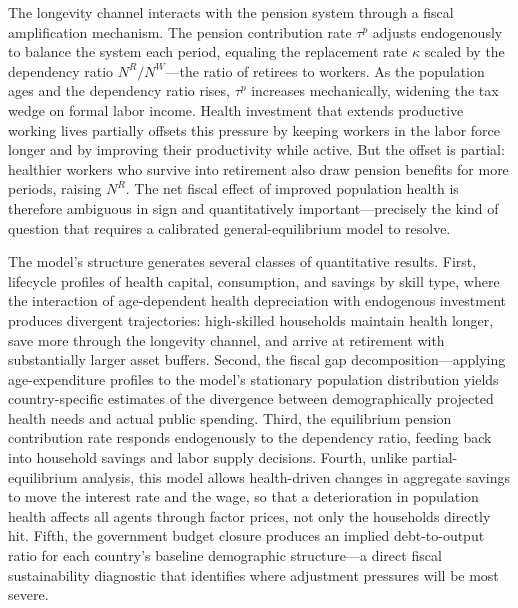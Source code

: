 \documentclass[12pt,a4paper]{article}
\begin{document}
The longevity channel interacts with the pension system through a fiscal amplification mechanism. The pension contribution rate $\tau^p$ adjusts endogenously to balance the system each period, equaling the replacement rate $\kappa$ scaled by the dependency ratio $N^R/N^W$---the ratio of retirees to workers. As the population ages and the dependency ratio rises, $\tau^p$ increases mechanically, widening the tax wedge on formal labor income. Health investment that extends productive working lives partially offsets this pressure by keeping workers in the labor force longer and by improving their productivity while active. But the offset is partial: healthier workers who survive into retirement also draw pension benefits for more periods, raising $N^R$. The net fiscal effect of improved population health is therefore ambiguous in sign and quantitatively important---precisely the kind of question that requires a calibrated general-equilibrium model to resolve.

The model's structure generates several classes of quantitative results. First, lifecycle profiles of health capital, consumption, and savings by skill type, where the interaction of age-dependent health depreciation with endogenous investment produces divergent trajectories: high-skilled households maintain health longer, save more through the longevity channel, and arrive at retirement with substantially larger asset buffers. Second, the fiscal gap decomposition---applying age-expenditure profiles to the model's stationary population distribution yields country-specific estimates of the divergence between demographically projected health needs and actual public spending. Third, the equilibrium pension contribution rate responds endogenously to the dependency ratio, feeding back into household savings and labor supply decisions. Fourth, unlike partial-equilibrium analysis, this model allows health-driven changes in aggregate savings to move the interest rate and the wage, so that a deterioration in population health affects all agents through factor prices, not only the households directly hit. Fifth, the government budget closure produces an implied debt-to-output ratio for each country's baseline demographic structure---a direct fiscal sustainability diagnostic that identifies where adjustment pressures will be most severe.
\end{document}
